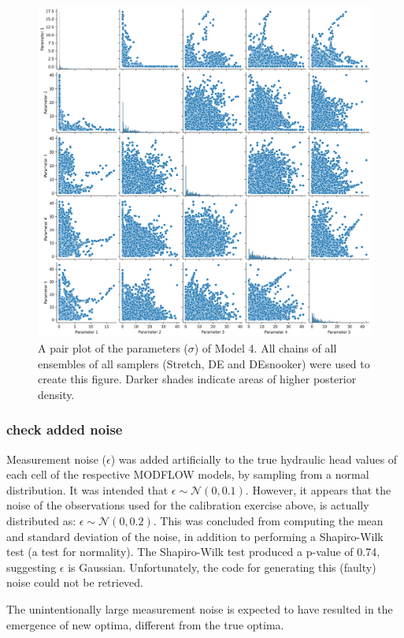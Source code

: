 \begin{figure}[ht]
\centering
\includegraphics[width=\textwidth]{Figures/appendix_figs/C1.4 pair plot Model 4.png}
\caption{A pair plot of the parameters ($\sigma$) of Model 4. All chains of all ensembles of all samplers (Stretch, DE and DEsnooker) were used to create this figure. Darker shades indicate areas of higher posterior density.}\label{fig_logbook_1.4_pair_model4}
\end{figure}

\subsubsection{check added noise}\label{check noise}
Measurement noise ($\epsilon$) was added artificially to the true hydraulic head values of each cell of the respective MODFLOW models, by sampling from a normal distribution. It was intended that $\epsilon \sim \mathcal{N}(0, 0.1)$. However, it appears that the noise of the observations used for the calibration exercise above, is actually distributed as: $\epsilon \sim \mathcal{N}(0, 0.2)$. This was concluded from computing the mean and standard deviation of the noise, in addition to performing a Shapiro-Wilk test (a test for normality). The Shapiro-Wilk test produced a p-value of 0.74, suggesting $\epsilon$ is Gaussian. Unfortunately, the code for generating this (faulty) noise could not be retrieved. 

The unintentionally large measurement noise is expected to have resulted in the emergence of new optima, different from the true optima. 
